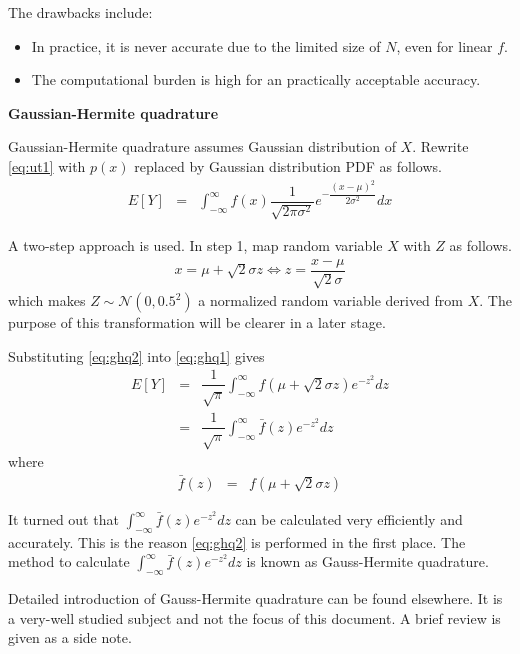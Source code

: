 The drawbacks include:
\begin{itemize}
	\item In practice, it is never accurate due to the limited size of $N$, even for linear $f$.
	\item The computational burden is high for an practically acceptable accuracy.
\end{itemize}

\vspace{0.1in}
\noindent \textbf{Gaussian-Hermite quadrature}
\vspace{0.1in}

Gaussian-Hermite quadrature assumes Gaussian distribution of $X$. Rewrite \eqref{eq:ut1} with $p(x)$ replaced by Gaussian distribution PDF as follows.
\begin{eqnarray}
	E\left[Y\right] &=& \int_{-\infty}^{\infty}f(x)\dfrac{1}{\sqrt{2\pi\sigma^2}}e^{-\dfrac{(x-\mu)^2}{2\sigma^2}}dx \label{eq:ghq1}
\end{eqnarray}

A two-step approach is used. In step 1, map random variable $X$ with $Z$ as follows.
\begin{eqnarray}
	x = \mu + \sqrt{2}\sigma z \Leftrightarrow z = \dfrac{x-\mu}{\sqrt{2}\sigma} \label{eq:ghq2}
\end{eqnarray}
which makes $Z\sim\mathcal{N}(0, 0.5^2)$ a normalized random variable derived from $X$. The purpose of this transformation will be clearer in a later stage.

Substituting \eqref{eq:ghq2} into \eqref{eq:ghq1} gives
\begin{eqnarray}
	E\left[Y\right] &=& \dfrac{1}{\sqrt{\pi}}\int_{-\infty}^{\infty}f\left(\mu + \sqrt{2}\sigma z\right) e^{-z^2}dz \nonumber \\
	&=& \dfrac{1}{\sqrt{\pi}}\int_{-\infty}^{\infty}\bar{f}(z)e^{-z^2}dz \label{eq:ghq3}
\end{eqnarray}
where
\begin{eqnarray}
	\bar{f}(z) &=& f\left(\mu + \sqrt{2}\sigma z\right) \nonumber
\end{eqnarray}

It turned out that $\int_{-\infty}^{\infty}\bar{f}(z)e^{-z^2}dz$ can be calculated very efficiently and accurately. This is the reason \eqref{eq:ghq2} is performed in the first place. The method to calculate $\int_{-\infty}^{\infty}\bar{f}(z)e^{-z^2}dz$ is known as Gauss-Hermite quadrature.

Detailed introduction of Gauss-Hermite quadrature can be found elsewhere. It is a very-well studied subject and not the focus of this document. A brief review is given as a side note.

